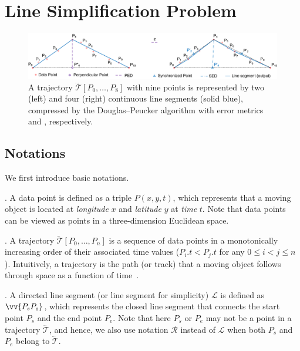 \section{Line Simplification Problem}

\begin{figure}[tb!]
\centering
\vspace{-1ex}
\includegraphics[scale=0.66]{figures/Fig-DP.png}
\vspace{-1ex}
\caption{\small A trajectory $\dddot{\mathcal{T}}[P_0, \ldots, P_{8}]$  with nine points is represented by two (left) and four (right) continuous line segments (solid blue), compressed by the Douglas--Peucker algorithm \cite{Douglas:Peucker} with error metrics \ped and \sed, respectively.}
\vspace{-2ex}
\label{fig:notations}
\end{figure}

\subsection{Notations}

We first introduce basic notations.

. A data point is defined as a triple $P(x, y, t)$, which represents that a moving object is located at {\em longitude} $x$ and {\em latitude} $y$ at {\em time} $t$. Note that data points can be viewed as points in a three-dimension Euclidean space.

. A trajectory $\dddot{\mathcal{T}}[P_0, \ldots, P_n]$ is a sequence of data points in a monotonically increasing order of their associated time values (\ie $P_i.t < P_j.t$ for any $0\le i<j\le n$). Intuitively, a trajectory is the path (or track) that a moving object follows through space as a function of time~\cite{physics-trajectory}.


. A directed line segment (or line segment for simplicity) $\mathcal{L}$ is defined as $\vv{P_{s}P_{e}}$, which represents the closed line segment that connects the start point $P_s$ and the end point $P_e$.
Note that here $P_s$ or $P_e$ may not be a point in a trajectory $\dddot{\mathcal{T}}$, and hence, we also use notation $\mathcal{R}$ instead of $\mathcal{L}$ when both $P_s$ and $P_e$ belong to $\dddot{\mathcal{T}}$.

